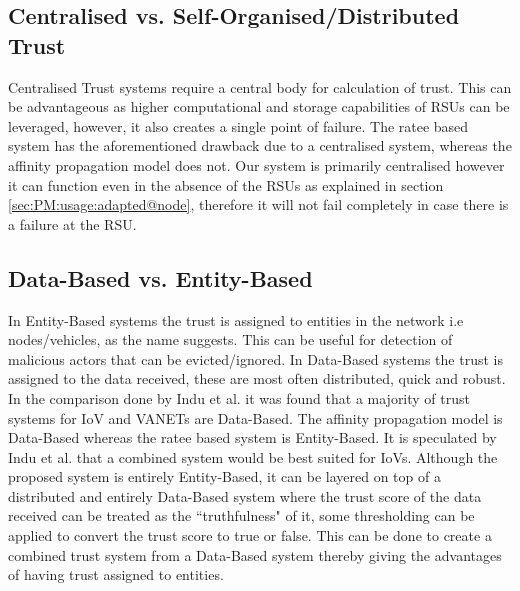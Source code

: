 \documentclass[journal]{IEEEtran}
\begin{document}
\subsection{Centralised vs. Self-Organised/Distributed Trust}
Centralised Trust systems require a central body for calculation of trust. This can be advantageous as higher computational and storage capabilities of RSUs can be leveraged, however, it also creates a single point of failure. %
The ratee based system has the aforementioned drawback due to a centralised system, whereas the affinity propagation model does not. Our system is primarily centralised however it can function even in the absence of the RSUs as explained in section \ref{sec:PM:usage:adapted@node}, therefore it will not fail completely in case there is a failure at the RSU.
\subsection{Data-Based vs. Entity-Based}
In Entity-Based systems the trust is assigned to entities in the network i.e nodes/vehicles, as the name suggests. This can be useful for detection of malicious actors that can be evicted/ignored.
In Data-Based systems the trust is assigned to the data received, these are most often distributed, quick and robust.
In the comparison done by Indu et al.\cite{c:compareTrust} it was found that a majority of trust systems for IoV and VANETs are Data-Based. The affinity propagation model is Data-Based whereas the ratee based system is Entity-Based. It is speculated by Indu et al.\cite{c:compareTrust} that a combined system would be best suited for IoVs. Although the proposed system is entirely Entity-Based, it can be layered on top of a distributed and entirely Data-Based system where the trust score of the data received can be treated as the ``truthfulness" of it, some thresholding can be applied to convert the trust score to true or false. This can be done to create a combined trust system from a Data-Based system thereby giving the advantages of having trust assigned to entities.
 
\end{document}
